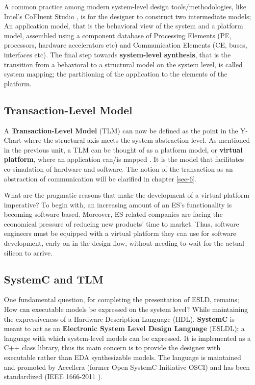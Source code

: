 \documentclass[12pt,twoside]{article}
\begin{document}
A common practice among modern system-level design tools/methodologies, 
like Intel's CoFluent Studio \cite{citation}, 
is for the designer to construct two intermediate models;
An application model, that is the behavioral view of the system and 
a platform model, assembled using a component database of Processing Elements (PE, processors, hardware accelerators etc) and Communication Elements (CE, buses, interfaces etc).
The final step towards \textbf{system-level synthesis}, that is the transition from a behavioral to a structural model on the system level, is called system mapping;
the partitioning of the application to the elements of the platform.


\subsection{Transaction-Level Model}
\label{sec-3-4}
A \textbf{Transaction-Level Model} (TLM) can now be defined as the point in the Y-Chart where the structural axis meets the system abstraction level.
As mentioned in the previous unit, a TLM can be thought of as a platform model, or \textbf{virtual platform}, where an application can/is mapped \cite{Rigo2011}.
It is the model that facilitates co-simulation of hardware and software.
The notion of the transaction as an abstraction of communication will be clarified in chapter \ref{sec-6}.

What are the pragmatic reasons that make the development of a virtual platform imperative?
To begin with, an increasing amount of an ES's functionality is becoming software based. 
Moreover, ES related companies are facing the economical pressure of reducing new products' time to market.
Thus, software engineers must be equipped with a virtual platform they can use for software development, early on in the design flow, without needing to wait for the actual silicon to arrive.


\subsection{SystemC and TLM}
\label{sec-3-5}
One fundamental question, for completing the presentation of ESLD, remains; How can executable models be expressed on the system level?
While maintaining the expressiveness of a Hardware Description Language (HDL), \textbf{SystemC} is meant to act as an \textbf{Electronic System Level Design Language} (ESLDL);
a language with which system-level models can be expressed.
It is implemented as a C++ class library, thus its main concern is to provide the designer with executable rather than EDA synthesizable models.
The language is maintained and promoted by Accellera (former Open SystemC Initiative OSCI) and has been standardized (IEEE 1666-2011 \cite{OpenSystemCInitiative2012}).
\end{document}
